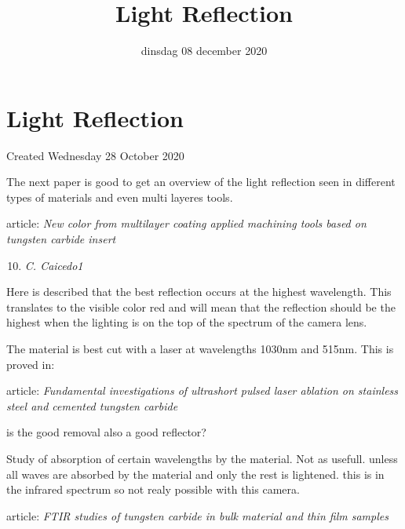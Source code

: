 \documentclass{scrartcl}
\title{Light Reflection}
\date{dinsdag 08 december 2020}
\author{}
\begin{document}
\maketitle

		\section{Light Reflection}

Created Wednesday 28 October 2020



The next paper is good to get an overview of the light reflection seen in different types of materials and even multi layeres tools.

	article: \emph{New color from multilayer coating applied machining tools based on tungsten carbide insert}
	
	\begin{enumerate}[A]
	\setcounter{enumi}{9}
	\item \emph{C. Caicedo1}
	\end{enumerate}


Here is described that the best reflection occurs at the highest wavelength. This translates to the visible color red and will mean that the reflection should be the highest when the lighting is on the top of the spectrum of the camera lens. 



The material is best cut with a laser at wavelengths 1030nm and 515nm. This is proved in: 

	article: \emph{Fundamental investigations of ultrashort pulsed laser ablation on stainless steel and cemented tungsten carbide}
	
	is the good removal also a good reflector?
	
		

Study of absorption of certain wavelengths by the material. Not as usefull. unless all waves are absorbed by the material and only the rest is lightened. this is in the infrared spectrum so not realy possible with this camera.

	article: \emph{FTIR studies of tungsten carbide in bulk material and thin film samples}
	
\end{document}
